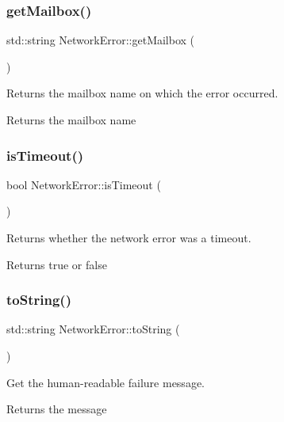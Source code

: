 \subsubsection{\texorpdfstring{get\+Mailbox()}{getMailbox()}}
{\footnotesize\ttfamily std\+::string Network\+Error\+::get\+Mailbox (\begin{DoxyParamCaption}{ }\end{DoxyParamCaption})}



Returns the mailbox name on which the error occurred. 

\begin{DoxyReturn}{Returns}
the mailbox name 
\end{DoxyReturn}
\mbox{\label{class_network_error_aed1abc8506b8ea2b9f9aa52ca57b4919}} 
\subsubsection{\texorpdfstring{is\+Timeout()}{isTimeout()}}
{\footnotesize\ttfamily bool Network\+Error\+::is\+Timeout (\begin{DoxyParamCaption}{ }\end{DoxyParamCaption})}



Returns whether the network error was a timeout. 

\begin{DoxyReturn}{Returns}
true or false 
\end{DoxyReturn}
\mbox{\label{class_network_error_a4e1d7848aa269db3b09fa90c2029d801}} 
\subsubsection{\texorpdfstring{to\+String()}{toString()}}
{\footnotesize\ttfamily std\+::string Network\+Error\+::to\+String (\begin{DoxyParamCaption}{ }\end{DoxyParamCaption})}



Get the human-\/readable failure message. 

\begin{DoxyReturn}{Returns}
the message 
\end{DoxyReturn}
\mbox{\label{class_network_error_ab58c37852b9f99a4d162e39febf83a80}} 
